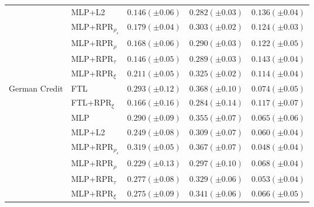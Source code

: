 \begin{tabular}{lllll}
 & MLP+L2 & $0.146 (\pm0.06)$ & $0.282 (\pm0.03)$ & $0.136 (\pm0.04)$ \\
 & MLP+RPR$_{\rho_s}$ & $0.179 (\pm0.04)$ & $0.303 (\pm0.02)$ & $0.124 (\pm0.03)$ \\
 & MLP+RPR$_{\rho}$ & $0.168 (\pm0.06)$ & $0.290 (\pm0.03)$ & $0.122 (\pm0.05)$ \\
 & MLP+RPR$_{\tau}$ & $0.146 (\pm0.05)$ & $0.289 (\pm0.03)$ & $0.143 (\pm0.04)$ \\
 & MLP+RPR$_{\xi}$ & $0.211 (\pm0.05)$ & $0.325 (\pm0.02)$ & $0.114 (\pm0.04)$ \\
\cline{1-5}
\multirow[t]{8}{*}{German Credit} & FTL & $0.293 (\pm0.12)$ & $0.368 (\pm0.10)$ & $0.074 (\pm0.05)$ \\
 & FTL+RPR$_{\xi}$ & $0.166 (\pm0.16)$ & $0.284 (\pm0.14)$ & $0.117 (\pm0.07)$ \\
 & MLP & $0.290 (\pm0.09)$ & $0.355 (\pm0.07)$ & $0.065 (\pm0.06)$ \\
 & MLP+L2 & $0.249 (\pm0.08)$ & $0.309 (\pm0.07)$ & $0.060 (\pm0.04)$ \\
 & MLP+RPR$_{\rho_s}$ & $0.319 (\pm0.05)$ & $0.367 (\pm0.07)$ & $0.048 (\pm0.04)$ \\
 & MLP+RPR$_{\rho}$ & $0.229 (\pm0.13)$ & $0.297 (\pm0.10)$ & $0.068 (\pm0.04)$ \\
 & MLP+RPR$_{\tau}$ & $0.277 (\pm0.08)$ & $0.329 (\pm0.06)$ & $0.053 (\pm0.04)$ \\
 & MLP+RPR$_{\xi}$ & $0.275 (\pm0.09)$ & $0.341 (\pm0.06)$ & $0.066 (\pm0.05)$ \\
\cline{1-5}
\bottomrule
\end{tabular}
